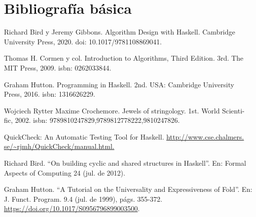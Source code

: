 \documentclass[letterpaper,11pt]{article}
\begin{document}
\section{Bibliografía básica}

\begin{enumerate}[label={[\arabic*]}]
\item Richard Bird y Jeremy Gibbons. Algorithm Design with Haskell. Cambridge University Press,
2020. doi: 10.1017/9781108869041.
\item Thomas H. Cormen y col. Introduction to Algorithms, Third Edition. 3rd. The MIT Press,
2009. isbn: 0262033844.
\item Graham Hutton. Programming in Haskell. 2nd. USA: Cambridge University Press, 2016.
isbn: 1316626229.
\item Wojciech Rytter Maxime Crochemore. Jewels of stringology. 1st. World Scienti- fic, 2002.
isbn: 9789810247829,9789812778222,9810247826.
\item QuickCheck: An Automatic Testing Tool for Haskell.
\url{http://www.cse.chalmers. se/~rjmh/QuickCheck/manual.html.}
\item Richard Bird. ``On building cyclic and shared structures in Haskell''. En: Formal Aspects of
Computing 24 (jul. de 2012).
\item Graham Hutton. ``A Tutorial on the Universality and Expressiveness of Fold''.
En: J. Funct. Program. 9.4 (jul. de 1999), págs. 355-372.
\url{https://doi.org/10.1017/S0956796899003500}.

\end{enumerate}
\end{document}
